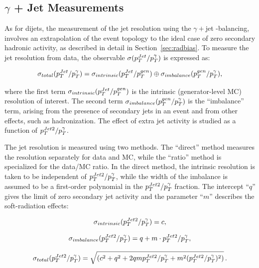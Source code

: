 \subsection{$\gamma$ + Jet Measurements}
\label{sec:res_gjet}

As for dijets, the measurement of the jet \pt resolution using the $\gamma+$jet \pt-balancing, involves an extrapolation of the event 
topology  to the ideal case of zero secondary hadronic activity, as described in detail in Section~\ref{sec:radbias}. To measure the jet \pt resolution from data, the observable $\sigma(p_{{T}}^{Jet}/p_{{T}}^{\gamma})$ is expressed as: 

\begin{equation}
   \sigma_{total}(p_{{T}}^{Jet}/p_{{T}}^{\gamma}) =  \sigma_{intrinsic}(p_{{T}}^{Jet}/p_{{T}}^{gen}) \oplus \sigma_{imbalance}(p_{{T}}^{gen}/p_{{T}}^{\gamma}),
\end{equation}

where the first term $\sigma_{intrinsic}(p_{{T}}^{Jet}/p_{{T}}^{gen})$ is the intrinsic (generator-level MC) resolution of interest. The second term $\sigma_{imbalance}(p_{{T}}^{gen}/p_{{T}}^{\gamma})$ is the ``imbalance'' term, arising from the presence of secondary jets in an event and from other effects, such as hadronization. The effect of extra jet activity is studied as a function of $p_{{T}}^{Jet2}/p_{{T}}^{\gamma}$. 

The jet \pt resolution is measured using two methods. The ``direct'' method measures the \pt resolution separately for data and MC, while the ``ratio'' method is specialized for the data/MC ratio. In the direct method, the intrinsic resolution is  taken to be independent of $p_{{T}}^{Jet2}/p_{{T}}^{\gamma}$, while the width of the imbalance is assumed to be a first-order polynomial in the 
$p_{{T}}^{Jet2}/p_{{T}}^{\gamma}$ fraction. The intercept ``$q$'' gives the limit of zero secondary jet activity and the parameter ``$m$'' describes the soft-radiation effects:

\begin{equation}
   \sigma_{intrinsic}(p_{{T}}^{Jet2}/p_{{T}}^{\gamma}) = c,
\end{equation}

\begin{equation}\label{eq:imb}
   \sigma_{imbalance} (p_{{T}}^{Jet2}/p_{{T}}^{\gamma}) = q + m \cdot p_{{T}}^{Jet2}/p_{{T}}^{\gamma},
\end{equation}

\begin{equation} \label{eq:totalRes}
   \sigma_{total} (p_{{T}}^{Jet2}/p_{{T}}^{\gamma}) = \sqrt{(c^2 + q^2 + 2qm p_{{T}}^{Jet2}/p_{{T}}^{\gamma}+m^2(p_{{T}}^{Jet2}/p_{{T}}^{\gamma})^2)}\,.
\end{equation}


